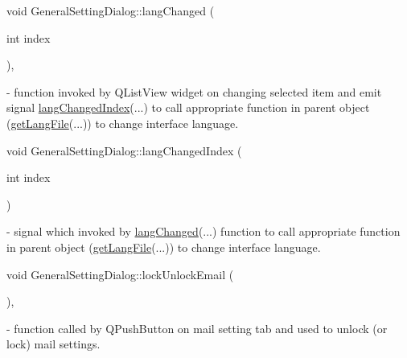 \mbox{\label{classGeneralSettingDialog_a80bce87bcafdf14692465fc5ae181a4c}} 
{\footnotesize\ttfamily void General\+Setting\+Dialog\+::\texorpdfstring{lang\+Changed}{langChanged} (\begin{DoxyParamCaption}\item[{int}]{index }\end{DoxyParamCaption}){\ttfamily [private]}, {\ttfamily [slot]}}  - function invoked by Q\+List\+View widget on changing selected item and emit signal \hyperlink{classGeneralSettingDialog_ac3d2f3477274bedf08848cc24eaece06}{lang\+Changed\+Index}(...) to call appropriate function in parent object (\hyperlink{classMainWindow_a96b56bd09db03ada451752dbbf993f12}{get\+Lang\+File}(...)) to change interface language.

\mbox{\label{classGeneralSettingDialog_ac3d2f3477274bedf08848cc24eaece06}} 
{\footnotesize\ttfamily void General\+Setting\+Dialog\+::\texorpdfstring{lang\+Changed\+Index}{langChangedIndex} (\begin{DoxyParamCaption}\item[{int}]{index }\end{DoxyParamCaption}){\ttfamily [signal]}} - signal which invoked by \hyperlink{classGeneralSettingDialog_a80bce87bcafdf14692465fc5ae181a4c}{lang\+Changed}(...) function to call appropriate function in parent object (\hyperlink{classMainWindow_a96b56bd09db03ada451752dbbf993f12}{get\+Lang\+File}(...)) to change interface language.

\mbox{\label{classGeneralSettingDialog_a53e28908636048d815628b85dcaaca4c}} 
{\footnotesize\ttfamily void General\+Setting\+Dialog\+::\texorpdfstring{lock\+Unlock\+Email}{lockUnlockEmail} (\begin{DoxyParamCaption}{ }\end{DoxyParamCaption}){\ttfamily [private]}, {\ttfamily [slot]}} - function called by Q\+Push\+Button on mail setting tab and used to unlock (or lock) mail settings.

